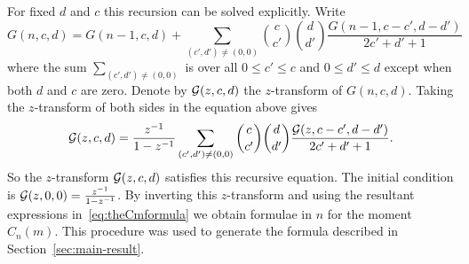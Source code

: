\documentclass[draftcls, onecolumn, 11pt]{IEEEtran}
\begin{document}
For fixed $d$ and $c$ this recursion can be solved explicitly.  Write
\[
G(n,c,d) = G(n-1,c,d) + \sum_{ (c',d') \neq (0,0)} \binom{c}{c'}\binom{d}{d'} \frac{G(n-1,c-c',d-d')}{2c'+d'+1}
\]
where the sum $\sum_{ (c',d') \neq (0,0)}$ is over all $0 \leq c' \leq c$ and $0 \leq d' \leq d$ except when both $d$ and $c$ are zero.  Denote by $\mathcal G(z,c,d)$ the $z$-transform of $G(n,c,d)$.  Taking the $z$-transform of both sides in the equation above gives
\[
\mathcal G(z,c,d) = \frac{z^{-1}}{1-z^{-1}} \sum_{ (c',d') \neq (0,0)} \binom{c}{c'}\binom{d}{d'} \frac{\mathcal G(z,c-c',d-d')}{2c'+d'+1}.
\]
So the $z$-transform $\mathcal G(z,c,d)$ satisfies this recursive equation.  The initial condition is $\mathcal G(z,0,0) = \frac{z^{-1}}{1 - z^{-1}}$.  By inverting this $z$-transform and using the resultant expressions in~\eqref{eq:theCmformula} we obtain formulae in $n$ for the moment $C_n(m)$.  This procedure was used to generate the formula described in Section~\ref{sec:main-result}.




\small






\end{document}
